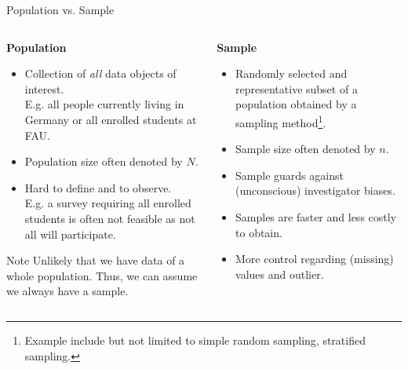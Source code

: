 \begin{frame}{Population vs. Sample}
	\begin{columns}[t]
		\begin{column}{0.5\columnwidth}
			\centering \textbf{Population}
			\begin{itemize}
				\item Collection of \textit{all} data objects of interest.\\ E.g. all
				      people currently living in Germany or all enrolled students at FAU.
				\item Population size often denoted by $N$.
				\item Hard to define and to observe.\\E.g. a survey requiring all enrolled
				      students is often not feasible as not all will participate.
			\end{itemize}
			\begin{alertblock}{Note}
				Unlikely that we have data of a whole population. Thus, we can assume we
				always have a sample.
			\end{alertblock}
		\end{column}
		\begin{column}{0.5\columnwidth}
			\centering \textbf{Sample}
			\begin{itemize}
				\item Randomly selected and representative subset of a population obtained
				      by a sampling method\footnote[frame]{Example include but not limited to
					      simple random sampling, stratified sampling.}.
				\item Sample size often denoted by $n$.
				\item Sample guards against (unconscious) investigator biases.
				\item Samples are faster and less costly to obtain.
				\item More control regarding (missing) values and outlier.
			\end{itemize}
		\end{column}
	\end{columns}
\end{frame}

